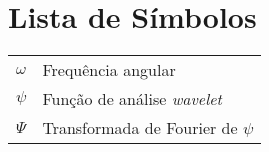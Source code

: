 \chapter{Lista de Símbolos}

\begin{tabular}{ll}
    $\omega$ & Frequência angular\\
    $\psi$ & Função de análise \textit{wavelet}\\
    $\Psi$ & Transformada de Fourier de $\psi$\\
\end{tabular}
